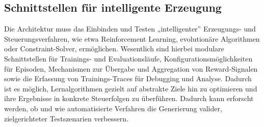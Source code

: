 \subsection{Schnittstellen für intelligente Erzeugung}

Die Architektur muss das Einbinden und Testen „intelligenter” Erzeugungs- und Steuerungsverfahren, wie etwa Reinforcement Learning, evolutionäre Algorithmen oder Constraint-Solver, ermöglichen. Wesentlich sind hierbei modulare Schnittstellen für Trainings- und Evaluationsläufe, Konfigurationsmöglichkeiten für Episoden, Mechanismen zur Übergabe und Aggregation von Reward-Signalen sowie die Erfassung von Trainings-Traces für Debugging und Analyse. Dadurch ist es möglich, Lernalgorithmen gezielt auf abstrakte Ziele hin zu optimieren und ihre Ergebnisse in konkrete Steuerfolgen zu überführen. Dadurch kann erforscht werden, ob und wie automatisierte Verfahren die Generierung valider, zielgerichteter Testszenarien verbessern.
